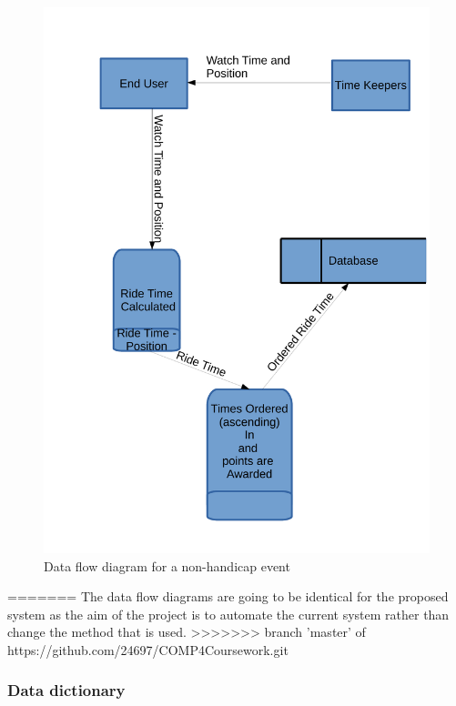 \begin{figure}
	\includegraphics[width=\textwidth]{./Non-HandicapDFD-PS.pdf}
	\caption{Data flow diagram for a non-handicap event}
\end{figure}
=======
The data flow diagrams are going to be identical for the proposed system as the aim of the project is to automate the current system rather than change the method that is used.
>>>>>>> branch 'master' of https://github.com/24697/COMP4Coursework.git

\subsubsection{Data dictionary}

